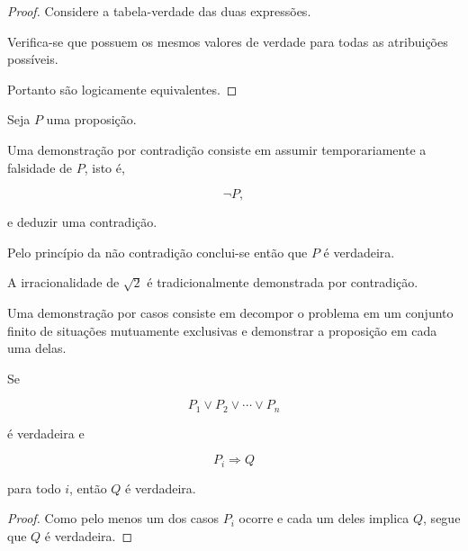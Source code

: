 \documentclass[../../main]{subfiles}
\begin{document}
\begin{proof}

	Considere a tabela-verdade das duas expressões.

	Verifica-se que possuem os mesmos valores de verdade para todas as
	atribuições possíveis.

	Portanto são logicamente equivalentes.

\end{proof}

\begin{defn}
	\label{def:matematica:logica-matematica:metodos-de-demonstracao:contradicao}

	Seja \(P\) uma proposição.

	Uma demonstração por contradição consiste em assumir
	temporariamente a falsidade de \(P\), isto é,

	\[
		\neg P,
	\]

	e deduzir uma contradição.

	Pelo princípio da não contradição conclui-se então que \(P\) é
	verdadeira.
\end{defn}

\begin{ex}

	A irracionalidade de \(\sqrt{2}\) é tradicionalmente demonstrada por
	contradição.

\end{ex}

\begin{defn}
	\label{def:matematica:logica-matematica:metodos-de-demonstracao:casos}

	Uma demonstração por casos consiste em decompor o problema em um
	conjunto finito de situações mutuamente exclusivas e demonstrar a
	proposição em cada uma delas.
\end{defn}

\begin{prop}
	\label{prop:matematica:logica-matematica:metodos-de-demonstracao:principio-casos}

	Se

	\[
		P_1 \lor P_2 \lor \cdots \lor P_n
	\]

	é verdadeira e

	\[
		P_i \Rightarrow Q
	\]

	para todo \(i\), então \(Q\) é verdadeira.
\end{prop}

\begin{proof}

	Como pelo menos um dos casos \(P_i\) ocorre e cada um deles implica
	\(Q\), segue que \(Q\) é verdadeira.

\end{proof}
\end{document}
